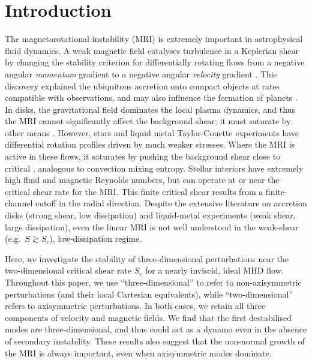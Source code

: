 \documentclass{rsproca_new}%
\begin{document}
\maketitle

\section{Introduction}
The magnetorotational instability (MRI) is extremely important in astrophysical fluid dynamics.
A weak magnetic field catalyses turbulence in a Keplerian shear by changing the stability criterion for differentially rotating flows from a negative angular \emph{momentum} gradient to a negative angular \emph{velocity} gradient \cite{1998RvMP...70....1B,2010RSPTA.368.1607J}.
This discovery explained the ubiquitous accretion onto compact objects at rates compatible with observations, and may also influence the formation of planets \cite{2007Natur.448.1022J}.
In disks, the gravitational field dominates the local plasma dynamics, and thus the MRI cannot significantly affect the background shear; it must saturate by other means \cite{2018MNRAS.474.3451X}.
However, stars and liquid metal Taylor-Couette experiments have differential rotation profiles driven by much weaker stresses.
Where the MRI is active in these flows, it saturates by pushing the background shear close to critical \cite{2015RSPSA.47140699V,2017ApJ...841....1C,2017ApJ...841....2C}, analogous to convection mixing entropy.
Stellar interiors have extremely high fluid and magnetic Reynolds numbers, but can operate at or near the critical shear rate for the MRI.
This finite critical shear results from a finite-channel cutoff in the radial direction.
Despite the extensive literature on accretion disks (strong shear, low dissipation) and liquid-metal experiments (weak shear, large dissipation), even the linear MRI is not well understood in the weak-shear (e.g.\ $S \gtrsim S_c$), low-dissipation regime. 

Here, we investigate the stability of three-dimensional perturbations near the two-dimensional critical shear rate $S_{c}$ for a nearly inviscid, ideal MHD flow.
Throughout this paper, we use ``three-dimensional'' to refer to non-axisymmetric perturbations (and their local Cartesian equivalents), while ``two-dimensional'' refers to axisymmetric perturbations.
In both cases, we retain all three components of velocity and magnetic fields.
We find that the first destabilised modes are three-dimensional, and thus could act as a dynamo even in the absence of secondary instability.
These results also suggest that the non-normal growth of the MRI is always important, even when axisymmetric modes dominate.
\end{document}
